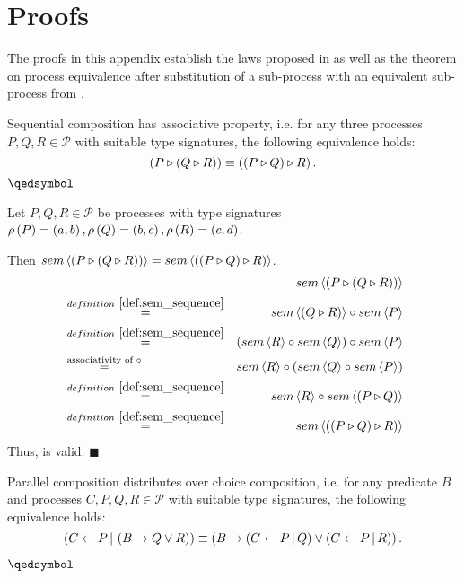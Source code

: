 \chapter{Proofs}
\label{chp:proofs}
The proofs in this appendix establish the laws proposed in  as well as the theorem on process equivalence after substitution of a sub-process with an equivalent sub-process from .

\vfill
\begin{theorem}
\label{thm:associativity_sequence}
Sequential composition has associative property, i.e. for any three processes $P, Q, R \in \mathcal{P}$ with suitable type signatures, the following equivalence holds:
\begin{equation*}
  \left( P \triangleright \left( Q \triangleright R \right) \right) \equiv \left( \left( P \triangleright Q \right) \triangleright R \right).
\end{equation*}
\hfill$\qedsymbol$
\end{theorem}

\begin{myproof}
Let $P, Q, R \in \mathcal{P}$ be processes with type signatures $\rho \left( P \right) = \left( a, b \right), \rho \left( Q \right) = \left( b, c \right), \rho \left( R \right) = \left( c, d \right)$.

Then $sem \left\langle \left( P \triangleright \left( Q \triangleright R \right) \right) \right\rangle = sem \left\langle \left( \left( P \triangleright Q \right) \triangleright R \right) \right\rangle$.
\begin{eqnarray*}
  & & \sem{\sequence{P}{\sequence{Q}{R}}} \\
  & \overset{\defref{def:sem_sequence}}{=} & \sem{\sequence{Q}{R}} \circ \sem{P} \\
  & \overset{\defref{def:sem_sequence}}{=} & \left( \sem{R} \circ \sem{Q} \right) \circ \sem{P} \\
  & \overset{\text{associativity of }\circ}{=} & \sem{R} \circ \left( \sem{Q} \circ \sem{P} \right) \\
  & \overset{\defref{def:sem_sequence}}{=} & \sem{R} \circ \sem{\sequence{P}{Q}} \\
  & \overset{\defref{def:sem_sequence}}{=} & \sem{\sequence{\sequence{P}{Q}}{R}}
\end{eqnarray*}
Thus,  is valid. \hfill$\blacksquare$
\end{myproof}


\clearpage
\begin{theorem}
\label{thm:distributivity_parallel_choice}
Parallel composition distributes over choice composition, i.e. for any predicate $B$ and processes $C, P, Q, R \in \mathcal{P}$ with suitable type signatures, the following equivalence holds:
\begin{equation*}
  \left( C \gets P \, | \, \left( B \to Q \vee R \right) \right) \equiv \left( B \to \left( C \gets P \, | \, Q \right) \vee \left( C \gets P \, | \, R \right) \right).
\end{equation*}

\vspace*{-1em}
\hfill$\qedsymbol$
\end{theorem}

